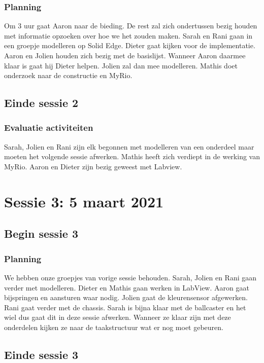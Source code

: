 \documentclass[a4paper,twoside,kulak]{kulakreport} %
\begin{document}
\subsection{Planning}
 Om 3 uur gaat Aaron naar de bieding. De rest zal zich ondertussen bezig houden met informatie opzoeken over hoe we het zouden maken. Sarah en Rani gaan in een groepje modelleren op Solid Edge. Dieter gaat kijken voor de implementatie. Aaron en Jolien houden zich bezig met de basislijst. Wanneer Aaron daarmee klaar is gaat hij Dieter helpen. Jolien zal dan mee modelleren. Mathis doet onderzoek naar de constructie en MyRio.

\section{Einde sessie 2}
\subsection{Evaluatie activiteiten}
 Sarah, Jolien en Rani zijn elk begonnen met modelleren van een onderdeel maar moeten het volgende sessie afwerken. Mathis heeft zich verdiept in de werking van MyRio. Aaron en Dieter zijn bezig geweest met Labview. 


\chapter{Sessie 3: 5 maart 2021}
\section{Begin sessie 3}
\subsection{Planning}
We hebben onze groepjes van vorige sessie behouden. Sarah, Jolien en Rani gaan verder met modelleren. Dieter en Mathis gaan werken in LabView. Aaron gaat bijspringen en aansturen waar nodig.  Jolien gaat de kleurensensor afgewerken. Rani gaat verder met de chassis. Sarah is bijna klaar met de ballcaster en het wiel dus gaat dit in deze sessie afwerken. Wanneer ze klaar zijn met deze onderdelen kijken ze naar de taakstructuur wat er nog moet gebeuren.

\section{Einde sessie 3}
\end{document}
